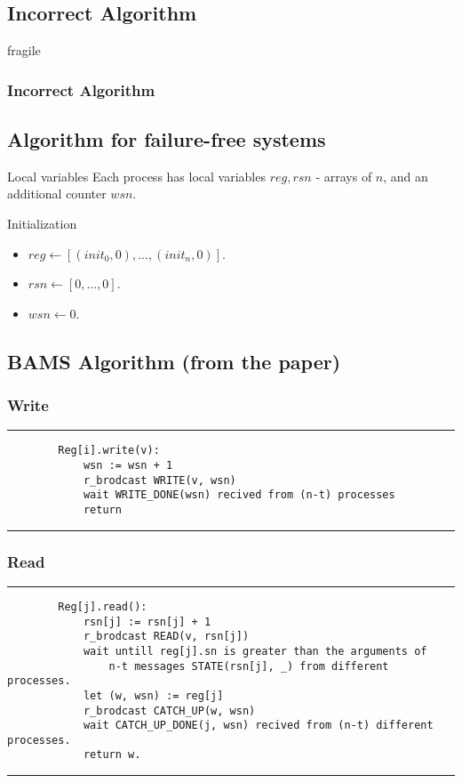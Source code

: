 \subsection{Incorrect Algorithm}
\begin{frame}{fragile}
    \frametitle{Incorrect Algorithm}
\end{frame}

\subsection{Algorithm for failure-free systems}
\begin{frame}
    \begin{block}{Local variables}
        Each process has local variables $reg, rsn$ - arrays of $n$, and 
        an additional counter $wsn$.
    \end{block}
    \begin{alertblock}{Initialization}
        \begin{itemize}
            \item $reg \leftarrow [(init_0, 0), ..., (init_n, 0)]$.
            \item $rsn \leftarrow [0, ..., 0]$.
            \item$wsn \leftarrow 0$.
        \end{itemize}
    \end{alertblock}
\end{frame}

\subsection{BAMS Algorithm (from the paper)}
\begin{frame}[fragile]
    \frametitle{Write}
    \rule{\textwidth}{1pt}
    \scriptsize
    \begin{verbatim}
        Reg[i].write(v):
            wsn := wsn + 1
            r_brodcast WRITE(v, wsn)
            wait WRITE_DONE(wsn) recived from (n-t) processes
            return
    \end{verbatim}
    \rule{\textwidth}{1pt}
\end{frame}

\begin{frame}[fragile]
    \frametitle{Read}
    \rule{\textwidth}{1pt}
    \scriptsize
    \begin{verbatim}
        Reg[j].read():
            rsn[j] := rsn[j] + 1
            r_brodcast READ(v, rsn[j])
            wait untill reg[j].sn is greater than the arguments of
                n-t messages STATE(rsn[j], _) from different processes.
            let (w, wsn) := reg[j]
            r_brodcast CATCH_UP(w, wsn)
            wait CATCH_UP_DONE(j, wsn) recived from (n-t) different processes.
            return w.
    \end{verbatim}
    \rule{\textwidth}{1pt}
\end{frame}

